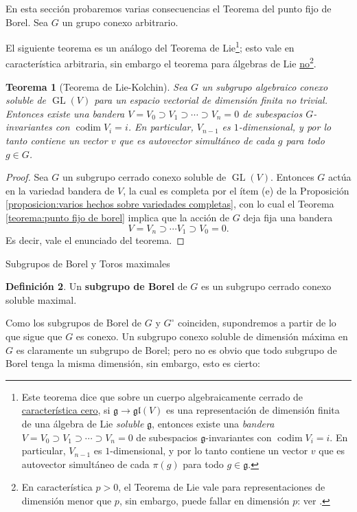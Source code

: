 \documentclass[spanish,10pt]{amsart}
\makeatletter
\renewcommand\subsection{\@startsection{subsection}{2}%
  \z@{.5\linespacing\@plus.7\linespacing}{-.5em}%
  {\normalfont\sffamily}}
\newtheorem{theorem}{Teorema}[section]
\theoremstyle{definition}
\newtheorem{definition}[theorem]{Definición}
\theoremstyle{remark}
\numberwithin{equation}{section}
\makeatother
\begin{document}
En esta sección probaremos varias consecuencias el Teorema del punto fijo de Borel. Sea $G$ un grupo conexo arbitrario.

El siguiente teorema es un análogo del Teorema de Lie\footnote{Este teorema dice que sobre un cuerpo algebraicamente cerrado de \underline{característica cero}, si $\mathfrak g \to \mathfrak {gl} (V)$ es una representación de dimensión finita de una álgebra de Lie \textit{soluble} $\mathfrak g$, entonces existe una \textit{bandera} $V = V_0 \supset V_1 \supset \cdots \supset V_n = 0$ de subespacios $\mathfrak g$-invariantes con $\operatorname{codim} V_i = i$. En particular, $V_{n-1}$ es $1$-dimensional, y por lo tanto contiene un vector $v$ que es autovector simultáneo de cada $\pi (g)$ para todo $g \in \mathfrak g$.}; esto vale en característica arbitraria, sin embargo el teorema para álgebras de Lie \underline{no}\footnote{En característica $p > 0$, el Teorema de Lie vale para representaciones de dimensión menor que $p$, sin embargo, puede fallar en dimensión $p$: ver \cite{wikipedia-lie-theorem}.}.
\begin{theorem}[Teorema de Lie-Kolchin]\label{teorema:Lie-Kolchin}
Sea $G$ un subgrupo algebraico conexo soluble de $\operatorname{GL} (V)$ para un espacio vectorial de dimensión finita no trivial. Entonces existe una bandera $V = V_0 \supset V_1 \supset \cdots \supset V_n = 0$ de subespacios $G$-invariantes con $\operatorname{codim} V_i = i$. En particular, $V_{n-1}$ es $1$-dimensional, y por lo tanto contiene un vector $v$ que es autovector simultáneo de cada $g$ para todo $g \in G$.
\end{theorem}
\begin{proof}
Sea $G$ un subgrupo cerrado conexo soluble de $\operatorname{GL} (V)$. Entonces $G$ actúa en la variedad bandera de $V$, la cual es completa por el ítem (e) de la Proposición \ref{proposicion:varios hechos sobre variedades completas}, con lo cual el Teorema \ref{teorema:punto fijo de borel} implica que la acción de $G$ deja fija una bandera
\[
    V = V_n \supset \cdots V_1 \supset V_0 = 0.
\]
Es decir, vale el enunciado del teorema.
\end{proof}

\subsection{Subgrupos de Borel y Toros maximales}

\begin{definition}
Un \textbf{subgrupo de Borel} de $G$ es un subgrupo cerrado conexo soluble maximal.
\end{definition}
Como los subgrupos de Borel de $G$ y $G^{\circ}$ coinciden, supondremos a partir de lo que sigue que $G$ es conexo. Un subgrupo conexo soluble de dimensión máxima en $G$ es claramente un subgrupo de Borel; pero no es obvio que todo subgrupo de Borel tenga la misma dimensión, sin embargo, esto es cierto:
\end{document}
